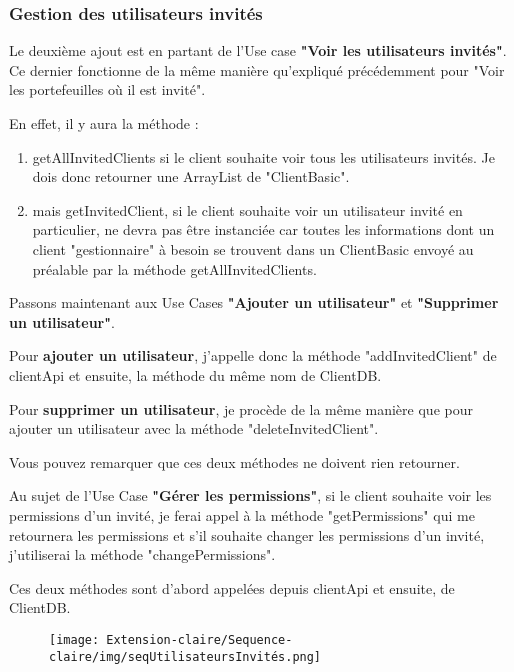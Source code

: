 \subsubsection{Gestion des utilisateurs invités}
\begin{flushleft}
Le deuxième ajout est en partant de l'Use case \textbf{"Voir les utilisateurs invités"}. Ce dernier fonctionne de la même manière qu'expliqué précédemment pour "Voir les portefeuilles où il est invité".
\end{flushleft}
\begin{flushleft}
En effet, il y aura la méthode : 
\end{flushleft}
\begin{enumerate}
\item getAllInvitedClients si le client souhaite voir tous les utilisateurs invités. Je dois donc retourner une ArrayList de "ClientBasic".
\item mais getInvitedClient, si le client souhaite voir un utilisateur invité en particulier, ne devra pas être instanciée car toutes les informations dont un client "gestionnaire" à besoin se trouvent dans un ClientBasic envoyé au préalable par la méthode getAllInvitedClients.
\end{enumerate}

\begin{flushleft}
Passons maintenant aux Use Cases \textbf{"Ajouter un utilisateur"} et \textbf{"Supprimer un utilisateur"}.
\end{flushleft}

\begin{flushleft}
Pour \textbf{ajouter un utilisateur}, j'appelle donc la méthode "addInvitedClient" de clientApi et ensuite, la méthode du même nom de ClientDB.
\end{flushleft}

\begin{flushleft}
Pour \textbf{supprimer un utilisateur}, je procède de la même manière que pour ajouter un utilisateur avec la méthode "deleteInvitedClient".
\end{flushleft}

\begin{flushleft}
Vous pouvez remarquer que ces deux méthodes ne doivent rien retourner.
\end{flushleft}

\begin{flushleft}
Au sujet de l'Use Case \textbf{"Gérer les permissions"}, si le client souhaite voir les permissions d'un invité, je ferai appel à la méthode "getPermissions" qui me retournera les permissions et s'il souhaite changer les permissions d'un invité, j'utiliserai la méthode "changePermissions".
\end{flushleft}

\begin{flushleft}
Ces deux méthodes sont d'abord appelées depuis clientApi et ensuite, de ClientDB.
\end{flushleft}

\newpage
\begin{figure}[h]
\centering
\texttt{[image: Extension-claire/Sequence-claire/img/seqUtilisateursInvités.png]}
\end{figure}